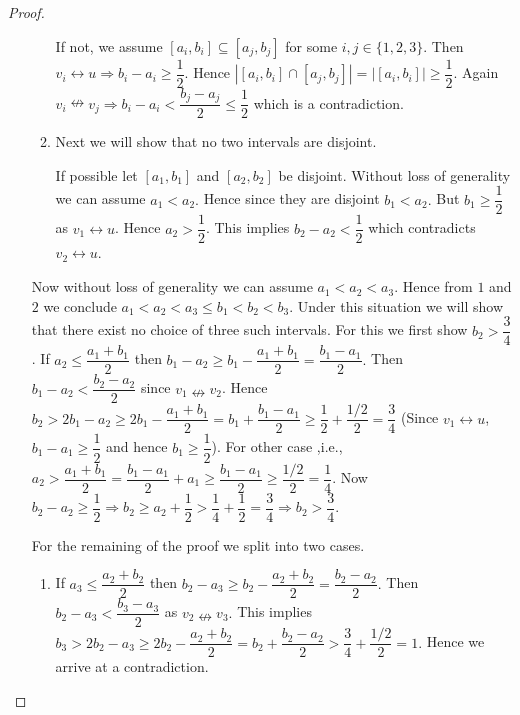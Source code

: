 \documentclass{article}
\theoremstyle{definition}
\numberwithin{equation}{section}
\begin{document}
\begin{proof}
\begin{itemize}
\begin{enumerate}
If not, we assume $[a_{i},b_{i}]\subseteq [a_{j},b_{j}]$ for some $i,j\in\{1,2,3\}$. Then  $v_{i}\leftrightarrow u\Rightarrow b_{i}-a_{i}\geq \dfrac{1}{2}$. Hence $|[a_{i},b_{i}]\cap[a_{j},b_{j}]|=|[a_{i},b_{i}]|\geq\dfrac{1}{2}$. Again $v_{i}\nleftrightarrow v_{j}\Rightarrow b_{i}-a_{i}<\dfrac{b_{j}-a_{j}}{2}\leq \dfrac{1}{2}$ which is a contradiction.

\vspace{0.1em}

\item Next we will show that no two intervals are disjoint. 

\vspace{0.1em}

If possible let $[a_{1},b_{1}]$ and $[a_{2},b_{2}]$ be disjoint. Without loss of generality we can assume $a_{1}< a_{2}.$ Hence since they are disjoint $ b_{1}< a_{2}.$ But $b_{1}\geq \dfrac{1}{2}$ as $v_{1}\leftrightarrow u$. Hence $a_{2}>\dfrac{1}{2}$. This implies $b_{2}-a_{2}<\dfrac{1}{2}$ which contradicts $v_{2}\leftrightarrow u$.
\end{enumerate}

\noindent Now without loss of generality we can assume $a_{1}<a_{2}<a_{3}.$ Hence from $1$ and $2$ we conclude $a_{1}<a_{2}<a_{3}\leq b_{1}< b_{2}< b_{3}$. Under this situation we will show that there exist no choice of three such intervals. For this we first show $b_{2}>\dfrac{3}{4}$.
If $a_{2}\leq \dfrac{a_{1}+b_{1}}{2}$ then $ b_{1}-a_{2}\geq b_{1}-\dfrac{a_{1}+b_{1}}{2}=\dfrac{b_{1}-a_{1}}{2}.$ Then $b_{1}-a_{2}<\dfrac{b_{2}-a_{2}}{2}$ since $v_{1}\nleftrightarrow v_{2}$.
Hence $b_{2}>2b_{1}-a_{2}\geq 2b_{1}-\dfrac{a_{1}+b_{1}}{2}=b_{1}+\dfrac{b_{1}-a_{1}}{2}\geq \dfrac{1}{2}+\dfrac{1/2}{2}=\dfrac{3}{4}$ (Since $v_{1}\leftrightarrow u$, $b_{1}-a_{1}\geq \dfrac{1}{2}$ and hence $b_{1}\geq \dfrac{1}{2}$).
For other case ,i.e., $a_{2}> \dfrac{a_{1}+b_{1}}{2}=\dfrac{b_{1}-a_{1}}{2}+a_{1}\geq \dfrac{b_{1}-a_{1}}{2}\geq \dfrac{1/2}{2}=\dfrac{1}{4}.$ Now $b_{2}-a_{2}\geq \dfrac{1}{2}\Rightarrow b_{2}\geq a_{2}+\dfrac{1}{2}>\dfrac{1}{4}+\dfrac{1}{2}=\dfrac{3}{4}\Rightarrow b_{2}>\dfrac{3}{4}.$ 

\vspace{0.6em}

\noindent For the remaining of the proof we split into two cases.

\begin{enumerate}
\item If $a_{3}\leq \dfrac{a_{2}+b_{2}}{2}$ then $b_{2}-a_{3}\geq b_{2}-\dfrac{a_{2}+b_{2}}{2}=\dfrac{b_{2}-a_{2}}{2}.$ Then $b_{2}-a_{3}<\dfrac{b_{3}-a_{3}}{2}$ as $v_{2}\nleftrightarrow v_{3}.$ This implies $b_{3}>2b_{2}-a_{3}\geq 2b_{2}-\dfrac{a_{2}+b_{2}}{2}=b_{2}+\dfrac{b_{2}-a_{2}}{2}> \dfrac{3}{4}+\dfrac{1/2}{2}=1.$ Hence we arrive at a contradiction.



\end{enumerate}
\end{itemize}
\end{proof}
\end{document}
